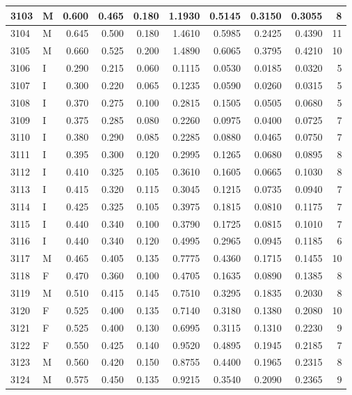 \documentclass[9pt,twocolumn,twoside,]{pnas-new}
\begin{document}
\begin{tabular}{l|l|r|r|r|r|r|r|r|r}
\hline
3103 & M & 0.600 & 0.465 & 0.180 & 1.1930 & 0.5145 & 0.3150 & 0.3055 & 8\\
\hline
3104 & M & 0.645 & 0.500 & 0.180 & 1.4610 & 0.5985 & 0.2425 & 0.4390 & 11\\
\hline
3105 & M & 0.660 & 0.525 & 0.200 & 1.4890 & 0.6065 & 0.3795 & 0.4210 & 10\\
\hline
3106 & I & 0.290 & 0.215 & 0.060 & 0.1115 & 0.0530 & 0.0185 & 0.0320 & 5\\
\hline
3107 & I & 0.300 & 0.220 & 0.065 & 0.1235 & 0.0590 & 0.0260 & 0.0315 & 5\\
\hline
3108 & I & 0.370 & 0.275 & 0.100 & 0.2815 & 0.1505 & 0.0505 & 0.0680 & 5\\
\hline
3109 & I & 0.375 & 0.285 & 0.080 & 0.2260 & 0.0975 & 0.0400 & 0.0725 & 7\\
\hline
3110 & I & 0.380 & 0.290 & 0.085 & 0.2285 & 0.0880 & 0.0465 & 0.0750 & 7\\
\hline
3111 & I & 0.395 & 0.300 & 0.120 & 0.2995 & 0.1265 & 0.0680 & 0.0895 & 8\\
\hline
3112 & I & 0.410 & 0.325 & 0.105 & 0.3610 & 0.1605 & 0.0665 & 0.1030 & 8\\
\hline
3113 & I & 0.415 & 0.320 & 0.115 & 0.3045 & 0.1215 & 0.0735 & 0.0940 & 7\\
\hline
3114 & I & 0.425 & 0.325 & 0.105 & 0.3975 & 0.1815 & 0.0810 & 0.1175 & 7\\
\hline
3115 & I & 0.440 & 0.340 & 0.100 & 0.3790 & 0.1725 & 0.0815 & 0.1010 & 7\\
\hline
3116 & I & 0.440 & 0.340 & 0.120 & 0.4995 & 0.2965 & 0.0945 & 0.1185 & 6\\
\hline
3117 & M & 0.465 & 0.405 & 0.135 & 0.7775 & 0.4360 & 0.1715 & 0.1455 & 10\\
\hline
3118 & F & 0.470 & 0.360 & 0.100 & 0.4705 & 0.1635 & 0.0890 & 0.1385 & 8\\
\hline
3119 & M & 0.510 & 0.415 & 0.145 & 0.7510 & 0.3295 & 0.1835 & 0.2030 & 8\\
\hline
3120 & F & 0.525 & 0.400 & 0.135 & 0.7140 & 0.3180 & 0.1380 & 0.2080 & 10\\
\hline
3121 & F & 0.525 & 0.400 & 0.130 & 0.6995 & 0.3115 & 0.1310 & 0.2230 & 9\\
\hline
3122 & F & 0.550 & 0.425 & 0.140 & 0.9520 & 0.4895 & 0.1945 & 0.2185 & 7\\
\hline
3123 & M & 0.560 & 0.420 & 0.150 & 0.8755 & 0.4400 & 0.1965 & 0.2315 & 8\\
\hline
3124 & M & 0.575 & 0.450 & 0.135 & 0.9215 & 0.3540 & 0.2090 & 0.2365 & 9\\

\end{tabular}
\end{document}
